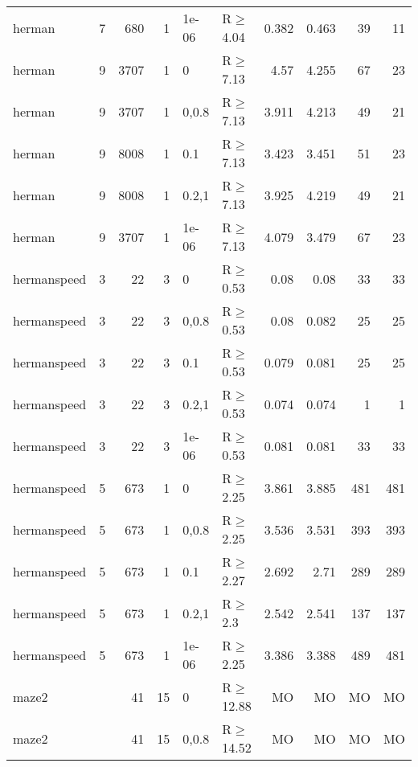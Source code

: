 \begin{longtable}{llrrllrrrr}
 herman        & 7        &    	680 &   1 & 1e-06 & R$\geq$4.04  & 0.382   & 0.463   & 39      & 11   \\
 herman        & 9        &   	3707 &   1 & 0     & R$\geq$7.13  & 4.57    & 4.255   & 67      & 23   \\
 herman        & 9        &   	3707 &   1 & 0,0.8 & R$\geq$7.13  & 3.911   & 4.213   & 49      & 21   \\
 herman        & 9        &   	8008 &   1 & 0.1   & R$\geq$7.13  & 3.423   & 3.451   & 51      & 23   \\
 herman        & 9        &   	8008 &   1 & 0.2,1 & R$\geq$7.13  & 3.925   & 4.219   & 49      & 21   \\
 herman        & 9        &   	3707 &   1 & 1e-06 & R$\geq$7.13  & 4.079   & 3.479   & 67      & 23   \\
 hermanspeed   & 3        &     	22 &   3 & 0     & R$\geq$0.53  & 0.08    & 0.08    & 33      & 33   \\
 hermanspeed   & 3        &     	22 &   3 & 0,0.8 & R$\geq$0.53  & 0.08    & 0.082   & 25      & 25   \\
 hermanspeed   & 3        &     	22 &   3 & 0.1   & R$\geq$0.53  & 0.079   & 0.081   & 25      & 25   \\
 hermanspeed   & 3        &     	22 &   3 & 0.2,1 & R$\geq$0.53  & 0.074   & 0.074   & 1       & 1    \\
 hermanspeed   & 3        &     	22 &   3 & 1e-06 & R$\geq$0.53  & 0.081   & 0.081   & 33      & 33   \\
 hermanspeed   & 5        &    	673 &   1 & 0     & R$\geq$2.25  & 3.861   & 3.885   & 481     & 481  \\
 hermanspeed   & 5        &    	673 &   1 & 0,0.8 & R$\geq$2.25  & 3.536   & 3.531   & 393     & 393  \\
 hermanspeed   & 5        &    	673 &   1 & 0.1   & R$\geq$2.27  & 2.692   & 2.71    & 289     & 289  \\
 hermanspeed   & 5        &    	673 &   1 & 0.2,1 & R$\geq$2.3   & 2.542   & 2.541   & 137     & 137  \\
 hermanspeed   & 5        &    	673 &   1 & 1e-06 & R$\geq$2.25  & 3.386   & 3.388   & 489     & 481  \\
 maze2         &          &     	41 &  15 & 0     & R$\geq$12.88 & MO      & MO      & MO      & MO   \\
 maze2         &          &     	41 &  15 & 0,0.8 & R$\geq$14.52 & MO      & MO      & MO      & MO   \\

\end{longtable}
